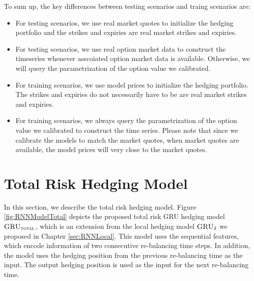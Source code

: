 \documentclass[letterpaper,12pt,titlepage,oneside,final]{book}
\numberwithin{equation}{section}
\theoremstyle{definition}
\newcommand{\model}{\textsc{GRU}_\delta}
\newcommand{\modelT}{\textsc{GRU}_{\textsc{total}}}
\begin{document}
To sum up, the key differences between testing scenarios and traing scenarios are:
\begin{itemize}
	\item  For testing scenarios, we use real market quotes to initialize the hedging portfolio and the strikes and expiries are real market strikes and expiries.
	\item  For testing scenarios, we use real option market data to construct the timeseries whenever asscoiated  option market data is available. Otherwise, we will query the parametrization of the option value we calibrated.
	\item For training scenarios, we use model prices to initialize the hedging portfolio. The strikes and expiries do not necessarily have to be are real market strikes and expiries.
	\item   For training scenarios, we always query the parametrization of the option value we calibrated to construct  the time series. Please note that  since we calibrate the models to match the market quotes, when market quotes are available, the model prices will very close to the market quotes. 
\end{itemize}





\section{Total Risk Hedging Model}
In this section, we describe the total risk hedging model.
Figure \ref{fig:RNNModelTotal} depicts the proposed total risk GRU  hedging  model $\modelT$,
which is an extension from the local hedging model $\model$ we proposed in Chapter \ref{sec:RNNLocal}.
This model uses the sequential features, which encode information of two consecutive re-balancing time steps. In addition, the model uses the hedging position from the previous re-balancing time as the input. The output hedging position is used as the input for the next re-balancing time.
\end{document}
